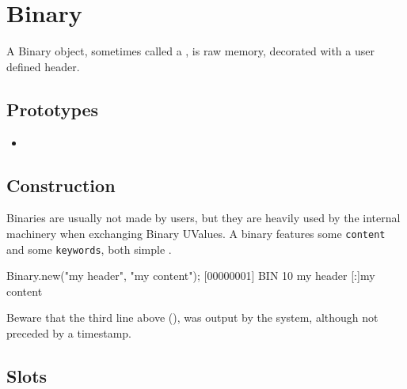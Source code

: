 \section{Binary}

A Binary object, sometimes called a , is raw memory,
decorated with a user defined header.

\subsection{Prototypes}
\begin{itemize}
\item {}
\end{itemize}

\subsection{Construction}

Binaries are usually not made by users, but they are heavily used by
the internal machinery when exchanging Binary UValues.  A binary
features some \lstinline|content| and some \lstinline|keywords|, both
simple .

\begin{urbiscript}[firstnumber=1]
Binary.new("my header", "my content");
[00000001] BIN 10 my header
[:]my content
\end{urbiscript}

Beware that the third line above (), was output by
the system, although not preceded by a timestamp.

\subsection{Slots}

